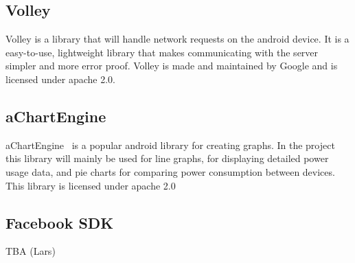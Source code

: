 \subsection{Volley}
Volley is a library that will handle network requests on the android device. It is a easy-to-use, lightweight library that makes communicating with the server simpler and more error proof.  Volley is made and maintained by Google and is licensed under apache 2.0.

\subsection{aChartEngine}
aChartEngine~\cite{achartengine} is a popular android library for creating graphs. In the project this library will mainly be used for line graphs, for displaying detailed power usage data, and pie charts for comparing power consumption between devices. This library is licensed under apache 2.0~\cite{apache20}

\subsection{Facebook SDK}
TBA (Lars)
